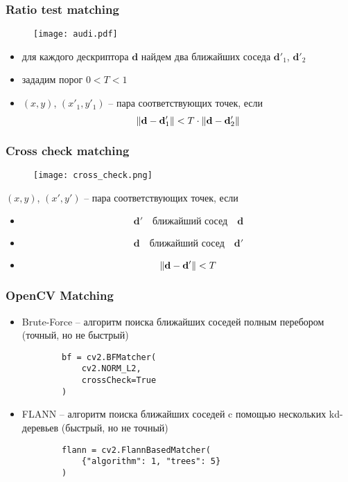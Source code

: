 \documentclass[12pt, usepdftitle=false, aspectratio=1610]{beamer}
\DeclarePairedDelimiter{\norm}{\lVert}{\rVert}
\begin{document}
\begin{frame}
\frametitle{Ratio test matching}
\begin{figure}
    \texttt{[image: audi.pdf]}
\end{figure}
\begin{itemize}
    \item для каждого дескриптора $\mathbf{d}$ найдем два ближайших соседа $\mathbf{d}'_1$, $\mathbf{d}'_2$
    \item зададим порог $0<T<1$
    \item $(x,y)$, $(x'_1,y'_1)$ -- пара соответствующих точек, если
    $$
        \norm{\mathbf{d}-\mathbf{d}'_1} < T\cdot\norm{\mathbf{d}-\mathbf{d}'_2}
    $$
\end{itemize}
\end{frame}

\begin{frame}
\frametitle{Cross check matching}
\begin{figure}
    \texttt{[image: cross\_check.png]}
\end{figure}
$(x,y)$, $(x',y')$ -- пара соответствующих точек, если
\begin{itemize}
    \item
    $$
        \mathbf{d}'\quad\mbox{ближайший сосед}\quad\mathbf{d}
    $$
    \item
    $$
        \mathbf{d}\quad\mbox{ближайший сосед}\quad\mathbf{d}'
    $$
    \item
    $$
        \norm{\mathbf{d}-\mathbf{d}'} < T
    $$
\end{itemize}
\end{frame}

\begin{frame}[fragile]
\frametitle{OpenCV Matching}
\begin{itemize}
    \item Brute-Force -- алгоритм поиска ближайших соседей полным перебором (точный, но не быстрый)
    \vspace*{0.1cm}
    \begin{verbatim}
        bf = cv2.BFMatcher(
            cv2.NORM_L2, 
            crossCheck=True
        )
    \end{verbatim}
    \vspace*{0.2cm}
    \item FLANN -- алгоритм поиска ближайших соседей c помощью нескольких kd-деревьев
    (быстрый, но не точный)
    \vspace*{0.1cm}
    \begin{verbatim}
        flann = cv2.FlannBasedMatcher(
            {"algorithm": 1, "trees": 5}
        )
    \end{verbatim}
\end{itemize}
\end{frame}
\end{document}
